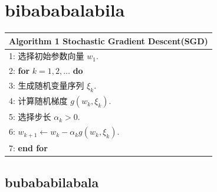 \section{bibababalabila}
\begin{center}
    \begin{tabular*}{\linewidth}{@{} l @{}}
        \hline
        \textbf{Algorithm 1} Stochastic Gradient Descent(SGD)  \\
        \hline
        1: 选择初始参数向量 $w_1$. \\
        2: \textbf{for} $k = 1, 2, \dots$ \textbf{do} \\
        3: \quad 生成随机变量序列 $\xi_k$. \\
        4: \quad 计算随机梯度 $g(w_k, \xi_k)$. \\
        5: \quad 选择步长 $\alpha_k > 0$. \\
        6: \quad  $w_{k+1} \leftarrow w_k - \alpha_k g(w_k, \xi_k)$. \\
        7: \textbf{end for} \\
        \hline
    \end{tabular*}
\end{center}
\subsection{bubababilabala}

